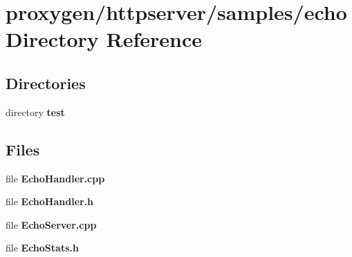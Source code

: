 \section{proxygen/httpserver/samples/echo Directory Reference}
\label{dir_6fd939a7fd2a5f1251cab31eb52aa6b0}
\subsection*{Directories}
\begin{DoxyCompactItemize}
\item 
directory {\bf test}
\end{DoxyCompactItemize}
\subsection*{Files}
\begin{DoxyCompactItemize}
\item 
file {\bf Echo\+Handler.\+cpp}
\item 
file {\bf Echo\+Handler.\+h}
\item 
file {\bf Echo\+Server.\+cpp}
\item 
file {\bf Echo\+Stats.\+h}
\end{DoxyCompactItemize}
